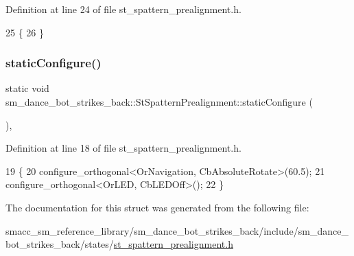 Definition at line 24 of file st\+\_\+spattern\+\_\+prealignment.\+h.


\begin{DoxyCode}
25   \{ 
26   \}
\end{DoxyCode}
\mbox{\label{structsm__dance__bot__strikes__back_1_1StSpatternPrealignment_a2e36a50e251ee0b35a8187dca30d52b2}} 
\subsubsection{\texorpdfstring{static\+Configure()}{staticConfigure()}}
{\footnotesize\ttfamily static void sm\+\_\+dance\+\_\+bot\+\_\+strikes\+\_\+back\+::\+St\+Spattern\+Prealignment\+::static\+Configure (\begin{DoxyParamCaption}{ }\end{DoxyParamCaption})\hspace{0.3cm}{\ttfamily [inline]}, {\ttfamily [static]}}



Definition at line 18 of file st\+\_\+spattern\+\_\+prealignment.\+h.


\begin{DoxyCode}
19   \{
20     configure\_orthogonal<OrNavigation, CbAbsoluteRotate>(60.5);
21     configure\_orthogonal<OrLED, CbLEDOff>();
22   \}
\end{DoxyCode}


The documentation for this struct was generated from the following file\+:\begin{DoxyCompactItemize}
\item 
smacc\+\_\+sm\+\_\+reference\+\_\+library/sm\+\_\+dance\+\_\+bot\+\_\+strikes\+\_\+back/include/sm\+\_\+dance\+\_\+bot\+\_\+strikes\+\_\+back/states/\hyperlink{st__spattern__prealignment_8h}{st\+\_\+spattern\+\_\+prealignment.\+h}\end{DoxyCompactItemize}
